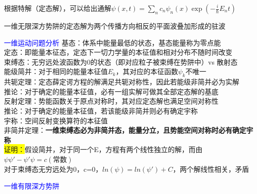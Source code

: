 \documentclass[a4paper,8pt]{extarticle} %
\newcommand{\bluetext}[1]{\textcolor{blue}{#1}}
\newcommand{\yellowback}[1]{\colorbox{yellow}{#1}}
\newcommand{\black}[1]{\textbf{#1}}
\begin{document}
\begin{multicols}{3}
根据特解（定态解），可以给出通解$\psi(x,t) = \sum_n c_n\psi_n(x)\exp(-\frac{i}{\hbar}E_nt)$ \hspace{2em} 

一维无限深方势阱的定态解为两个传播方向相反的平面波叠加形成的驻波

\bluetext{一维运动问题分析}
基态：体系中能量最低的状态，基态能量称为零点能\\
定态：即能量本征态，定态下一切力学量的本征值和相对分布不随时间改变\\
束缚态：无穷远处波函数为0的状态（即对应粒子被束缚在势阱中）vs 散射态\\
能级简并：对于相同的能量本征值$E_k$，其对应的本征函数$\psi_k$不唯一\\
共轭定理：定态薛定谔方程的解满足共轭对称性，因此若能级非简并必为实解\\
推论：对于确定的能量本征值，必有一组实解可做其全部定态解的基底\\
反射定理：势能函数关于原点对称时，其对应定态解也满足空间对称性\\
推论：对于确定的能量本征值，若该能级非简并则必有确定宇称\\
宇称：空间反射变换算符的本征值\\
非简并定理：\black{一维束缚态必为非简并态，能量分立，且势能空间对称时必有确定宇称}\\
\yellowback{证明：}假设简并，对于同一个E，方程有两个线性独立的解，而由$\psi\psi'-\psi'\psi=c(常数)$\\
对于束缚态无穷远处为0，c=0，$ln(\psi)=ln(\psi')+C$，两个解线性相关，矛盾

\bluetext{一维有限深方势阱}


\end{multicols}
\end{document}
